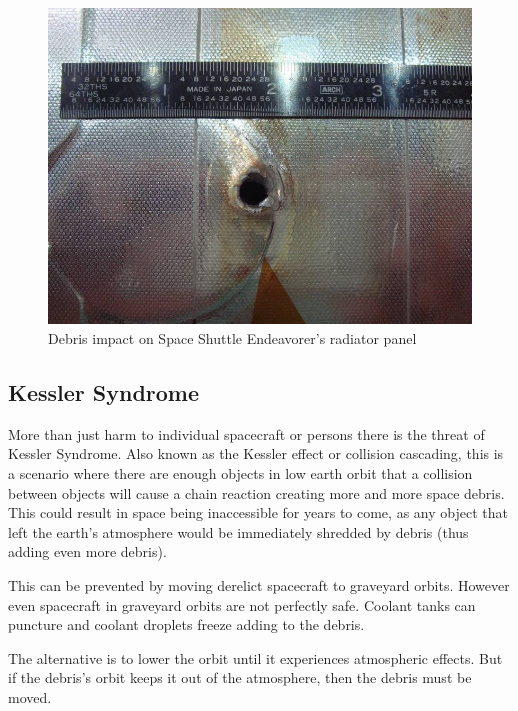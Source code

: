 \documentclass[12pt]{report}
\begin{document}
\begin{figure}
	\centering
	\includegraphics[width=0.7\linewidth]{STS-118_debris_entry}
	\caption{Debris impact on Space Shuttle Endeavorer's radiator panel\cite{endevHole}}
	\label{fig:sts-118debrisentry}
\end{figure}
	
	
	
	\subsection{Kessler Syndrome}
	More than just harm to individual spacecraft or persons there is the threat of Kessler Syndrome. Also known as the Kessler effect or collision cascading, this is a scenario where there are enough objects in low earth orbit that a collision between objects will cause a chain reaction creating more and more space debris. This could result in space being inaccessible for years to come, as any object that left the earth's atmosphere would be immediately shredded by debris (thus adding even more debris).\par 
	
	This can be prevented by moving derelict spacecraft to graveyard orbits. However even spacecraft in graveyard orbits are not perfectly safe. Coolant tanks can puncture and coolant droplets freeze adding to the debris. \par 
	
	The alternative is to lower the orbit until it experiences atmospheric effects. But if the debris's orbit keeps it out of the atmosphere, then the debris must be moved. 
\end{document}
